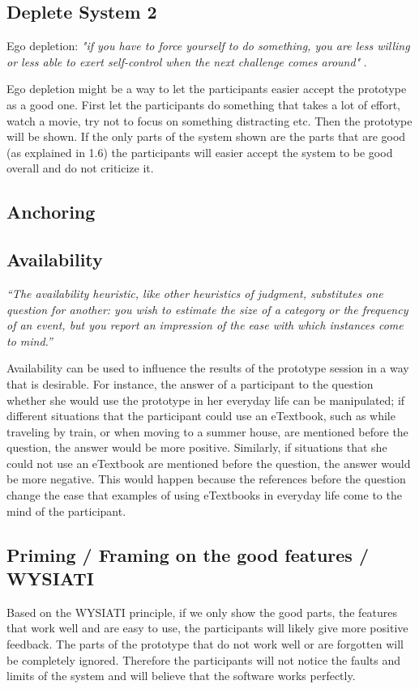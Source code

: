 \documentclass{article}
\begin{document}
\subsection{Deplete System 2}
Ego depletion:\emph{ "if you have to force yourself to do something, you are less willing
or less able to exert self-control when the next challenge comes around" }.

Ego depletion might be a way to let the participants easier accept the prototype
as a good one. First let the participants do something that takes a lot of effort, watch
a movie, try not to focus on something distracting etc. Then the prototype will
be shown. If the only parts of the system shown are the parts that are good
(as explained in 1.6) the participants will easier  accept the system to be good overall
 and do not criticize it.

\subsection{Anchoring}

\subsection{Availability}
\emph{``The availability heuristic, like other heuristics of judgment, substitutes one question for another: you wish to estimate the size of a category or the frequency of an event, but you report an impression of the ease with which instances come to mind.''}

Availability can be used to influence the results of the prototype session in a way that is desirable. For instance, the answer of a participant to the question whether she would use the prototype in her everyday life can be manipulated; if different situations that the participant could use an eTextbook, such as while traveling by train, or when moving to a summer house, are mentioned before the question, the answer would be more positive. Similarly,  if situations that she could not use an eTextbook are mentioned before the question, the answer would be more negative. This would happen because the references before the question change the ease that examples of using eTextbooks in everyday life come to the mind of the participant.

\subsection{Priming / Framing on the good features / WYSIATI}
Based on the WYSIATI principle, if we only show the good parts, the features that work well and are easy to use, the participants will likely give more positive feedback. The parts of
the prototype that do not work well or are forgotten will be completely ignored.
Therefore the participants will not notice the faults and limits of the system
and will believe that the software works perfectly.
\end{document}
